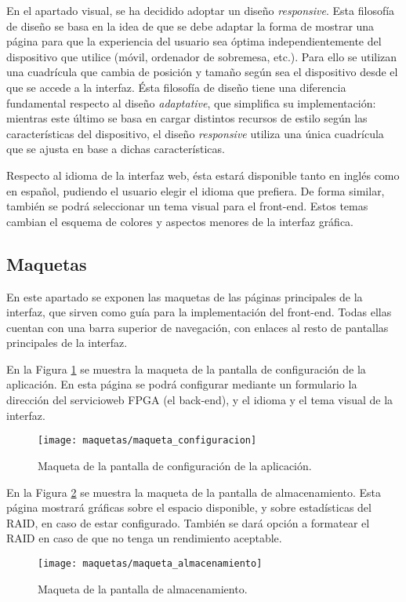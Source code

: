 En el apartado visual, se ha decidido adoptar un diseño \textit{responsive}.
Esta filosofía de diseño se basa en la idea de que se debe adaptar la forma de mostrar una página para que la experiencia del usuario sea óptima independientemente del dispositivo que utilice (móvil, ordenador de sobremesa, etc.).
Para ello se utilizan una cuadrícula que cambia de posición y tamaño según sea el dispositivo desde el que se accede a la interfaz.
Ésta filosofía de diseño tiene una diferencia fundamental respecto al diseño \textit{adaptative}, que simplifica su implementación: mientras este último se basa en cargar distintos recursos de estilo según las características del dispositivo, el diseño \textit{responsive} utiliza una única cuadrícula que se ajusta en base a dichas características.

Respecto al idioma de la interfaz web, ésta estará disponible tanto en inglés como en español, pudiendo el usuario elegir el idioma que prefiera.
De forma similar, también se podrá seleccionar un tema visual para el \gls{front-end}.
Estos temas cambian el esquema de colores y aspectos menores de la interfaz gráfica.


\subsection{Maquetas\label{ssec:dis:maquetas}}

En este apartado se exponen las maquetas de las páginas principales de la interfaz, que sirven como guía para la implementación del \gls{front-end}.
Todas ellas cuentan con una barra superior de navegación, con enlaces al resto de pantallas principales de la interfaz.

En la Figura \ref{fig:maqueta:configuracion} se muestra la maqueta de la pantalla de configuración de la aplicación.
En esta página se podrá configurar mediante un formulario la dirección del \gls{servicioweb} \gls{FPGA} (el \gls{back-end}), y el idioma y el tema visual de la interfaz.
\begin{figure}[!htp]
  \centering
  \texttt{[image: maquetas/maqueta\_configuracion]}
  \caption{Maqueta de la pantalla de configuración de la aplicación.}
  \label{fig:maqueta:configuracion}
\end{figure}
\clearpage

En la Figura \ref{fig:maqueta:almacenamiento} se muestra la maqueta de la pantalla de almacenamiento.
Esta página mostrará gráficas sobre el espacio disponible, y sobre estadísticas del \gls{RAID}, en caso de estar configurado.
También se dará opción a formatear el \gls{RAID} en caso de que no tenga un rendimiento aceptable.
\begin{figure}[!htp]
  \centering
  \texttt{[image: maquetas/maqueta\_almacenamiento]}
  \caption{Maqueta de la pantalla de almacenamiento.}
  \label{fig:maqueta:almacenamiento}
\end{figure}
\clearpage

